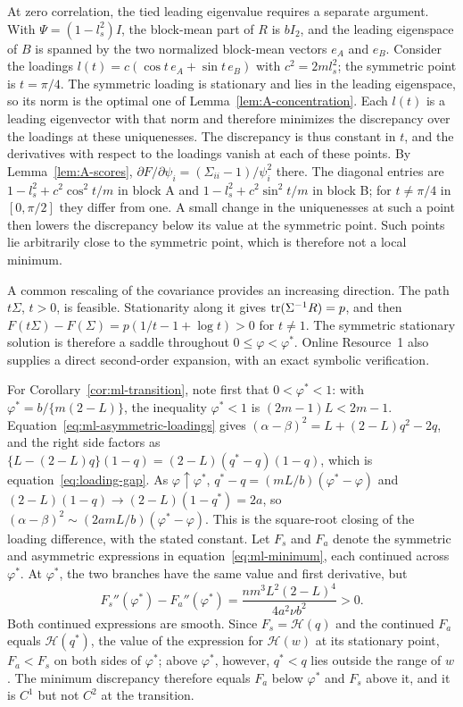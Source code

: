 At zero correlation, the tied leading eigenvalue requires a separate argument. With $\Psi=(1-l_s^2)I$, the block-mean part of $R$ is $bI_2$, and the leading eigenspace of $B$ is spanned by the two normalized block-mean vectors $e_A$ and $e_B$. Consider the loadings $l(t)=c(\cos t\,e_A+\sin t\,e_B)$ with $c^2=2ml_s^2$; the symmetric point is $t=\pi/4$. The symmetric loading is stationary and lies in the leading eigenspace, so its norm is the optimal one of Lemma~\ref{lem:A-concentration}. Each $l(t)$ is a leading eigenvector with that norm and therefore minimizes the discrepancy over the loadings at these uniquenesses. The discrepancy is thus constant in $t$, and the derivatives with respect to the loadings vanish at each of these points. By Lemma~\ref{lem:A-scores}, $\partial F/\partial\psi_i=(\Sigma_{ii}-1)/\psi_i^2$ there. The diagonal entries are $1-l_s^2+c^2\cos^2t/m$ in block A and $1-l_s^2+c^2\sin^2t/m$ in block B; for $t\ne\pi/4$ in $[0,\pi/2]$ they differ from one. A small change in the uniquenesses at such a point then lowers the discrepancy below its value at the symmetric point. Such points lie arbitrarily close to the symmetric point, which is therefore not a local minimum.

A common rescaling of the covariance provides an increasing direction. The path $t\Sigma$, $t>0$, is feasible. Stationarity along it gives $\operatorname{tr}(\Sigma^{-1}R)=p$, and then $F(t\Sigma)-F(\Sigma)=p(1/t-1+\log t)>0$ for $t\ne1$. The symmetric stationary solution is therefore a saddle throughout $0\le\varphi<\varphi^*$. Online Resource~1 also supplies a direct second-order expansion, with an exact symbolic verification.

For Corollary~\ref{cor:ml-transition}, note first that $0<\varphi^*<1$: with $\varphi^*=b/\{m(2-L)\}$, the inequality $\varphi^*<1$ is $(2m-1)L<2m-1$. Equation~\eqref{eq:ml-asymmetric-loadings} gives $(\alpha-\beta)^2=L+(2-L)q^2-2q$, and the right side factors as $\{L-(2-L)q\}(1-q)=(2-L)(q^*-q)(1-q)$, which is equation~\eqref{eq:loading-gap}. As $\varphi\uparrow\varphi^*$, $q^*-q=(mL/b)(\varphi^*-\varphi)$ and $(2-L)(1-q)\to(2-L)(1-q^*)=2a$, so $(\alpha-\beta)^2\sim(2amL/b)(\varphi^*-\varphi)$. This is the square-root closing of the loading difference, with the stated constant. Let $F_s$ and $F_a$ denote the symmetric and asymmetric expressions in equation~\eqref{eq:ml-minimum}, each continued across $\varphi^*$. At $\varphi^*$, the two branches have the same value and first derivative, but
\[
F_s''(\varphi^*)-F_a''(\varphi^*)
=\frac{nm^3L^2(2-L)^4}{4a^2\nu b^2}>0.
\]
Both continued expressions are smooth. Since $F_s=\mathcal H(q)$ and the continued $F_a$ equals $\mathcal H(q^*)$, the value of the expression for $\mathcal H(w)$ at its stationary point, $F_a<F_s$ on both sides of $\varphi^*$; above $\varphi^*$, however, $q^*<q$ lies outside the range of $w$. The minimum discrepancy therefore equals $F_a$ below $\varphi^*$ and $F_s$ above it, and it is $C^1$ but not $C^2$ at the transition.

